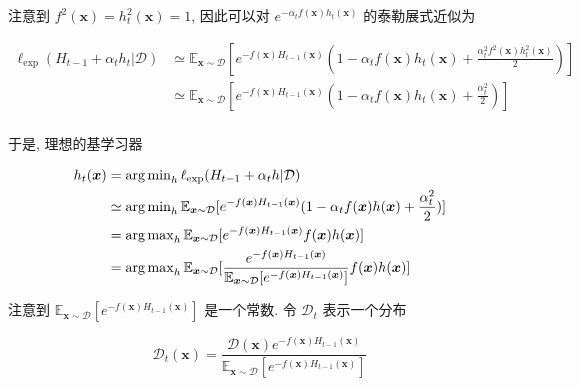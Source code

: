 \documentclass[answers]{exam}  %
\begin{document}
\begin{questions}
\begin{solution}
\begin{enumerate}
            注意到 $f^{2}(\bm{x}) = h_{t}^{2}(\bm{x})=1$, 因此可以对 $e^{-\alpha_{t}f(\bm{x})h_{t}(\bm{x})}$ 的泰勒展式近似为

            $$
              \begin{aligned}
                \ell_{\exp}(H_{t-1} + \alpha_{t} h_{t} | \mathcal{D}) & \simeq  \mathbb{E}_{\bm{x}\sim \mathcal{D}}[e^{-f(\bm{x})H_{t-1}(\bm{x})}(1-\alpha_{t}f(\bm{x})h_{t}(\bm{x}) + \frac{\alpha_{t}^{2}f^{2}(\bm{x})h_{t}^{2}(\bm{x})}{2})] \\
                                                                      & \simeq  \mathbb{E}_{\bm{x}\sim \mathcal{D}}[e^{-f(\bm{x})H_{t-1}(\bm{x})}(1-\alpha_{t}f(\bm{x})h_{t}(\bm{x}) + \frac{\alpha_{t}^{2}}{2})]                               \\
              \end{aligned}
            $$

            于是, 理想的基学习器

            $$
              \begin{aligned}
                h_{t}(\bm{x}) & = \operatorname{arg\,min}_{h} \ell_{\exp}(H_{t-1}+\alpha_{t}h | \mathcal{D})                                                                                                                  \\
                              & \simeq  \operatorname{arg\,min}_{h} \mathbb{E}_{\bm{x}\sim \mathcal{D}}[e^{-f(\bm{x})H_{t-1}(\bm{x})}(1-\alpha_{t}f(\bm{x})h(\bm{x}) + \frac{\alpha_{t}^{2}}{2})]                             \\
                              & = \operatorname{arg\,max}_{h} \mathbb{E}_{\bm{x}\sim \mathcal{D}}[e^{-f(\bm{x})H_{t-1}(\bm{x})}f(\bm{x})h(\bm{x})]                                                                            \\
                              & = \operatorname{arg\,max}_{h} \mathbb{E}_{\bm{x}\sim \mathcal{D}}[\frac{e^{-f(\bm{x})H_{t-1}(\bm{x})}}{\mathbb{E}_{\bm{x}\sim \mathcal{D}}[e^{-f(\bm{x})H_{t-1}(\bm{x})}]}f(\bm{x})h(\bm{x})] \\
              \end{aligned}
            $$

            注意到 $\mathbb{E}_{\bm{x}\sim \mathcal{D}}[e^{-f(\bm{x})H_{t-1}(\bm{x})}]$ 是一个常数. 令 $\mathcal{D}_{t}$ 表示一个分布

            $$
              \mathcal{D}_{t}(\bm{x}) = \frac{\mathcal{D}(\bm{x})e^{-f(\bm{x})H_{t-1}(\bm{x})}}{\mathbb{E}_{\bm{x}\sim \mathcal{D}}[e^{-f(\bm{x})H_{t-1}(\bm{x})}]}
            $$


\end{enumerate}
\end{solution}
\end{questions}
\end{document}
